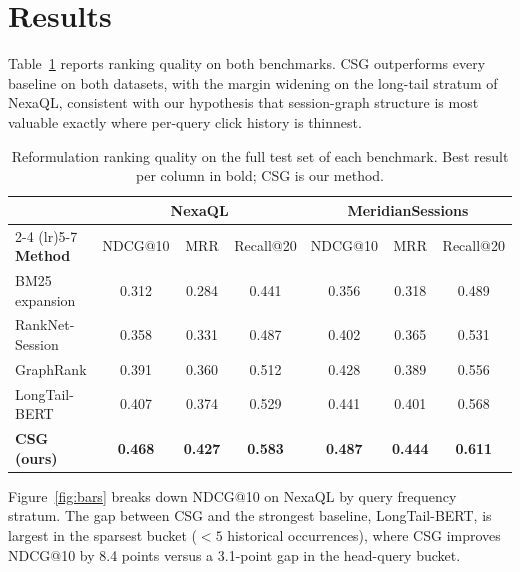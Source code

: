 \section{Results}
\label{sec:results}

Table~\ref{tab:results} reports ranking quality on both benchmarks. CSG outperforms
every baseline on both datasets, with the margin widening on the long-tail stratum
of NexaQL, consistent with our hypothesis that session-graph structure is most
valuable exactly where per-query click history is thinnest.

\begin{table}[t]
\centering
\small
\caption{Reformulation ranking quality on the full test set of each benchmark. Best
result per column in bold; CSG is our method.}
\label{tab:results}
\begin{tabular}{lcccccc}
\toprule
& \multicolumn{3}{c}{\textbf{NexaQL}} & \multicolumn{3}{c}{\textbf{MeridianSessions}} \\
\cmidrule(lr){2-4} \cmidrule(lr){5-7}
\textbf{Method} & NDCG@10 & MRR & Recall@20 & NDCG@10 & MRR & Recall@20 \\
\midrule
BM25 expansion              & 0.312 & 0.284 & 0.441 & 0.356 & 0.318 & 0.489 \\
RankNet-Session \citep{Whitfield2016RankNet} & 0.358 & 0.331 & 0.487 & 0.402 & 0.365 & 0.531 \\
GraphRank \citep{Rajan2021GraphRank}         & 0.391 & 0.360 & 0.512 & 0.428 & 0.389 & 0.556 \\
LongTail-BERT \citep{Lindqvist2020Contrastive} & 0.407 & 0.374 & 0.529 & 0.441 & 0.401 & 0.568 \\
\midrule
\rowcolor{wsdmblue!8}
\textbf{CSG (ours)} & \textbf{0.468} & \textbf{0.427} & \textbf{0.583} & \textbf{0.487} & \textbf{0.444} & \textbf{0.611} \\
\bottomrule
\end{tabular}
\end{table}

Figure~\ref{fig:bars} breaks down NDCG@10 on NexaQL by query frequency stratum. The
gap between CSG and the strongest baseline, LongTail-BERT, is largest in the sparsest
bucket ($<5$ historical occurrences), where CSG improves NDCG@10 by 8.4 points versus
a 3.1-point gap in the head-query bucket.

